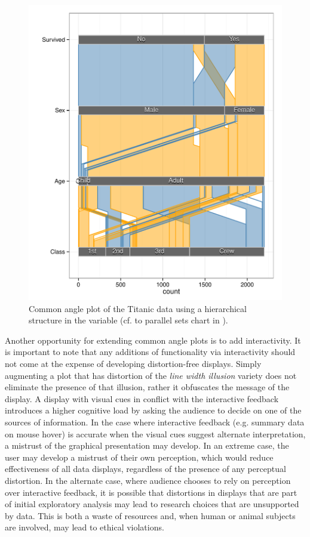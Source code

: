 \documentclass[journal]{vgtc}\usepackage{graphicx, color}
\begin{document}
\begin{figure}[hbtp]
\includegraphics[width=\linewidth]{ca-hierarchy}
\caption{\label{tit-hierarchy} Common angle plot of the Titanic data using a hierarchical structure in the variable (cf. to parallel sets chart in \cite{davies}). }
\end{figure}


Another opportunity for extending common angle plots is to add interactivity. It is important to note that
any additions of functionality via interactivity should not come at the expense of developing distortion-free
displays. Simply augmenting a plot that has distortion of the \emph{line width illusion} variety does not eliminate
the presence of that illusion, rather it obfuscates the message of the display. A display with visual cues in conflict
with the interactive feedback introduces a higher cognitive load by asking the audience to decide on one of the sources of information.
In the case where interactive feedback (e.g. summary data on mouse hover) is accurate when the visual cues
suggest alternate interpretation, a mistrust of the graphical presentation may develop. In an extreme case,
the user may develop a mistrust of their own perception, which would reduce effectiveness of all data displays, 
regardless of the presence of any perceptual distortion. In the alternate case, where audience chooses to
rely on perception over interactive feedback, it is possible that distortions in displays that are part of 
initial exploratory analysis may lead to research choices that are unsupported by data. This is both a waste of resources and, when human or animal subjects are involved, may lead to ethical violations.
\end{document}
